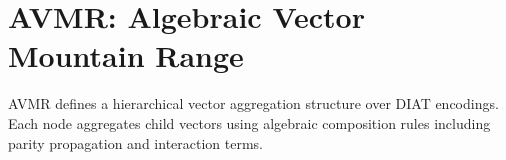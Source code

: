 \section*{AVMR: Algebraic Vector Mountain Range}

AVMR defines a hierarchical vector aggregation structure over DIAT encodings. Each node aggregates child vectors using algebraic composition rules including parity propagation and interaction terms.
